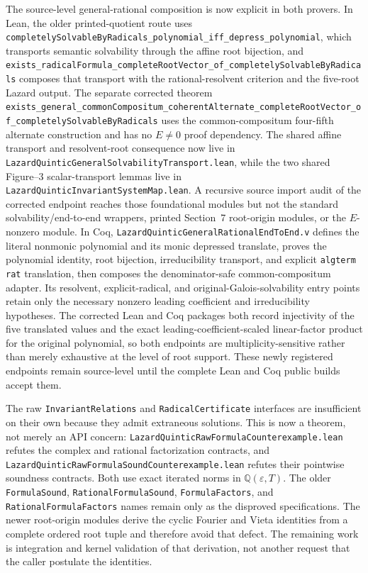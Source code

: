 \documentclass[11pt,a4paper,oneside]{article}
\newcommand{\lean}[1]{\nolinkurl{#1}}
\newcommand{\Q}{\mathbb{Q}}
\newcommand{\eps}{\varepsilon}
\begin{document}
The source-level general-rational composition is now explicit in both
provers.  In Lean, the older printed-quotient route uses
\lean{completelySolvableByRadicals_polynomial_iff_depress_polynomial},
which transports semantic solvability through the affine root bijection, and
\lean{exists_radicalFormula_completeRootVector_of_completelySolvableByRadicals}
composes that transport with the rational-resolvent criterion and the five-root
Lazard output.  The separate corrected theorem
\lean{exists_general_commonCompositum_coherentAlternate_completeRootVector_of_completelySolvableByRadicals}
uses the common-compositum four-fifth alternate construction and has no
$E\ne0$ proof dependency.  The shared affine transport and resolvent-root
consequence now live in
\texttt{LazardQuinticGeneralSolvabilityTransport.lean}, while the two shared
Figure--3 scalar-transport lemmas live in
\texttt{LazardQuinticInvariantSystemMap.lean}.  A recursive source import
audit of the corrected endpoint reaches those foundational modules but not
the standard solvability/end-to-end wrappers, printed Section~7 root-origin
modules, or the $E$-nonzero module.  In Coq,
\texttt{LazardQuinticGeneralRationalEndToEnd.v}
defines the literal nonmonic polynomial and its monic depressed translate,
proves the polynomial identity, root bijection, irreducibility transport, and
explicit \texttt{algterm rat} translation, then composes the denominator-safe
common-compositum adapter.  Its resolvent, explicit-radical, and
original-Galois-solvability entry points retain only the necessary nonzero
leading coefficient and irreducibility hypotheses.  The corrected Lean and
Coq packages both record injectivity of the five translated values and the exact
leading-coefficient-scaled linear-factor product for the original polynomial,
so both endpoints are multiplicity-sensitive rather than merely exhaustive
at the level of root support.  These newly registered
endpoints remain source-level until the complete Lean and Coq public builds
accept them.

The raw \lean{InvariantRelations} and \lean{RadicalCertificate} interfaces are
insufficient on their own because they admit extraneous solutions.  This is
now a theorem, not merely an API concern:
\lean{LazardQuinticRawFormulaCounterexample.lean} refutes the complex and
rational factorization contracts, and
\lean{LazardQuinticRawFormulaSoundCounterexample.lean} refutes their pointwise
soundness contracts.  Both use exact iterated norms in $\Q(\eps,T)$.  The
older \lean{FormulaSound}, \lean{RationalFormulaSound},
\lean{FormulaFactors}, and \lean{RationalFormulaFactors} names remain only as
the disproved specifications.  The newer root-origin modules derive the
cyclic Fourier and Vieta identities from a complete ordered root tuple and
therefore avoid that defect.  The remaining work is integration and kernel
validation of that derivation, not another request that the caller postulate
the identities.
\end{document}
